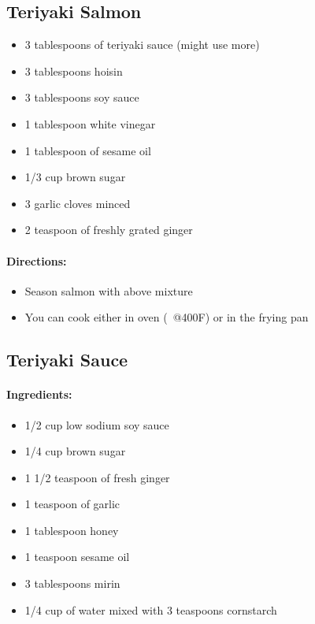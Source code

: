 \documentclass{article}
\begin{document}
\subsection{Teriyaki Salmon}{}

\begin{itemize}
	\item 3 tablespoons of teriyaki sauce (might use more)
	\item 3 tablespoons hoisin
	\item 3 tablespoons soy sauce
	\item 1 tablespoon white vinegar
	\item 1 tablespoon of sesame oil
	\item 1/3 cup brown sugar
	\item 3 garlic cloves minced
	\item 2 teaspoon of freshly grated ginger
\end{itemize}

\paragraph{Directions:}
\begin{itemize}
	\item Season salmon with above mixture
	\item You can cook either in oven (~@400F) or in the frying pan
\end{itemize}

\subsection{Teriyaki Sauce}

\paragraph{Ingredients:}

\begin{itemize}
	\item 1/2 cup low sodium soy sauce
	\item 1/4 cup brown sugar
	\item 1 1/2 teaspoon of fresh ginger
	\item 1 teaspoon of garlic
	\item 1 tablespoon honey
	\item 1 teaspoon sesame oil
	\item 3 tablespoons mirin
	\item 1/4 cup of water mixed with 3 teaspoons cornstarch
\end{itemize}
\end{document}
